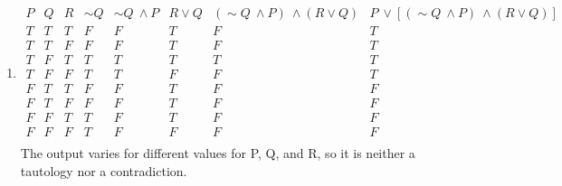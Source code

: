 \documentclass[12pt,letterpaper]{article}
\begin{document}
\begin{enumerate}[label= \textbf{\alph*)}]
		\item \begin{displaymath}
			\begin{array}{|c|c|c|c|c|c|c|c|}
				P &
				Q &
				R &
				\sim Q &
				\sim Q\ \land P &
				R \lor Q &
				(\sim Q\ \land P)\ \land (R \lor Q) &
				P\ \lor \left [(\sim Q\ \land P)\ \land (R \lor Q)\right ]\\ 
				\hline
				T & T & T & F & F & T & F & T\\
				T & T & F & F & F & T & F & T\\
				T & F & T & T & T & T & T & T\\
				T & F & F & T & T & F & F & T\\
				F & T & T & F & F & T & F & F\\
				F & T & F & F & F & T & F & F\\
				F & F & T & T & F & T & F & F\\
				F & F & F & T & F & F & F & F\\
			\end{array}
		\end{displaymath}
		The output varies for different values for P, Q, and R, so it is neither a tautology nor a contradiction.

	
\end{enumerate}
\end{document}
